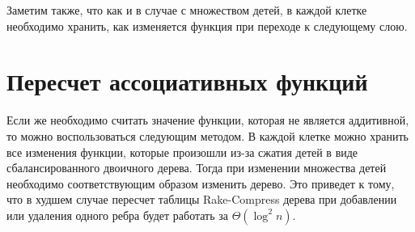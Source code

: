 Заметим также, что как и в случае с множеством детей, в каждой клетке необходимо хранить, как изменяется функция при переходе к следующему слою.

\FloatBarrier
\section{Пересчет ассоциативных функций}

Если же необходимо считать значение функции, которая не является аддитивной, то можно воспользоваться следующим методом.
В каждой клетке можно хранить все изменения функции, которые произошли из-за сжатия детей в виде сбалансированного двоичного дерева. 
Тогда при изменении множества детей необходимо соответствующим образом изменить дерево. 
Это приведет к тому, что в худшем случае пересчет таблицы Rake-Compress дерева при добавлении или удаления одного ребра будет работать за $\Theta(\log^2 n)$.


